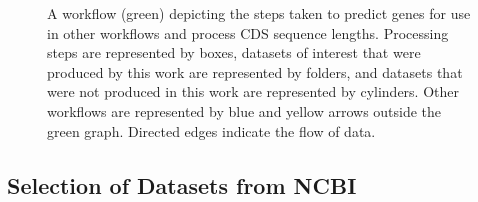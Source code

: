 \begin{figure}
  \centering
  \caption[Gene prediction workflow]{A workflow (green) depicting the steps taken to predict
    genes for use in other workflows and process CDS sequence
    lengths. Processing steps are represented by boxes, datasets of
    interest that were produced by this work are represented by
    folders, and datasets that were not produced in this work are
    represented by cylinders. Other workflows are represented by blue
    and yellow arrows outside the green graph. Directed edges
    indicate the flow of data.}\label{fig:predict-workflow}
\end{figure}

\subsection{Selection of Datasets from NCBI}\label{met:datasets}

